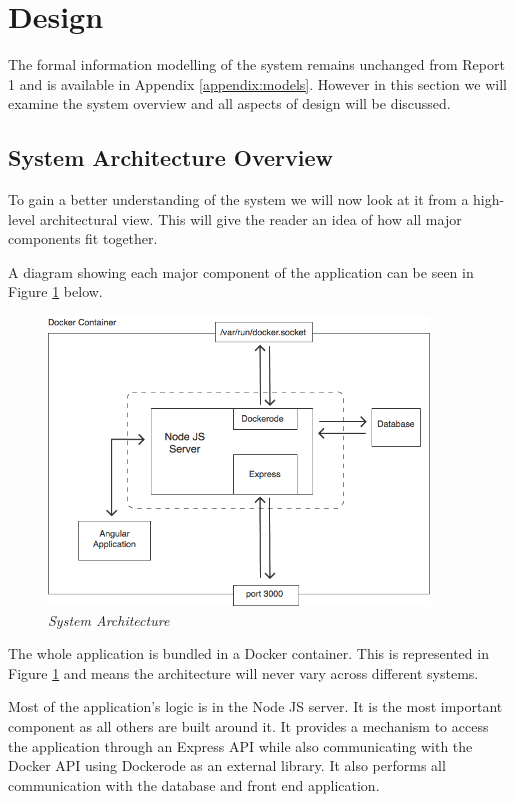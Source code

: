 \section{Design}
\label{sec:design}
The formal information modelling of the system remains unchanged from Report 1 and is available in Appendix \ref{appendix:models}. However in this section we will examine the system overview and all aspects of design will be discussed.

\subsection{System Architecture Overview}
To gain a better understanding of the system we will now look at it from a high-level architectural view. This will give the reader an idea of how all major components fit together.

A diagram showing each major component of the application can be seen in Figure \ref{fig:architecture} below.

\begin{figure}[!ht]
\centering
\includegraphics*[width=0.9\textwidth]{images/architecture}
\caption{\em System Architecture}
\label{fig:architecture}
\end{figure}

The whole application is bundled in a \gls{Docker container}. This is represented in Figure \ref{fig:architecture} and means the architecture will never vary across different systems.

Most of the application's logic is in the Node JS server. It is the most important component as all others are built around it. It provides a mechanism to access the application through an Express API while also communicating with the Docker API using Dockerode as an external library. It also performs all communication with the database and front end application.

